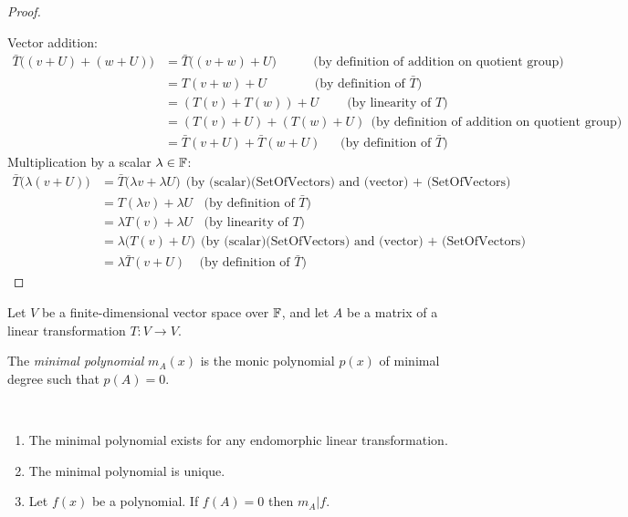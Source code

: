 \documentclass[12pt]{article}
\begin{document}
\begin{proof}~\\

  Vector addition:
  \begin{align*}
    \bar T\Big((v + U) + (w + U)\Big)
    &= \bar T\Big((v + w) +  U\Big) ~~~~~~~~~~~~~\text{(by definition of addition on quotient group)}\\
    &= T(v + w) + U              ~~~~~~~~~~~~~~~~~\text{(by definition of $\bar T$)}\\
    &= (T(v) + T(w)) + U              ~~~~~~~~~~\text{(by linearity of $T$)}\\
    &= (T(v) + U) + (T(w) + U) ~~\text{(by definition of addition on quotient group)}\\
    &= \bar T(v + U) + \bar T(w + U)              ~~~~~~~\text{(by definition of $\bar T$)}
  \end{align*}
  Multiplication by a scalar $\lambda \in \mathbb{F}$:
  \begin{align*}
    \bar T\Big(\lambda(v + U)\Big)
    &= \bar T\Big(\lambda v + \lambda U\Big) ~~\text{(by (scalar)(SetOfVectors) and (vector) + (SetOfVectors) syntax)}\\
    &= T(\lambda v) + \lambda U~~~~\text{(by definition of $\bar T$)}\\
    &= \lambda T(v) + \lambda U~~~~\text{(by linearity of $T$)}\\
    &= \lambda\Big(T(v) + U\Big)  ~~\text{(by (scalar)(SetOfVectors) and (vector) + (SetOfVectors) syntax)}\\
    &= \lambda \bar T(v + U)~~~~~\text{(by definition of $\bar T$)}
  \end{align*}
\end{proof}

\begin{definition*}
  Let $V$ be a finite-dimensional vector space over $\mathbb{F}$, and let $A$ be a matrix of a linear
  transformation $T:V \to V$.

  The \emph{minimal polynomial} $m_A(x)$ is the monic polynomial $p(x)$ of minimal degree such that
  $p(A) = 0$.
\end{definition*}

\begin{lemma*}~\\
  \begin{enumerate}
  \item The minimal polynomial exists for any endomorphic linear transformation.
  \item The minimal polynomial is unique.
  \item Let $f(x)$ be a polynomial. If $f(A) = 0$ then $m_A | f$.
  \end{enumerate}
\end{lemma*}
\end{document}
